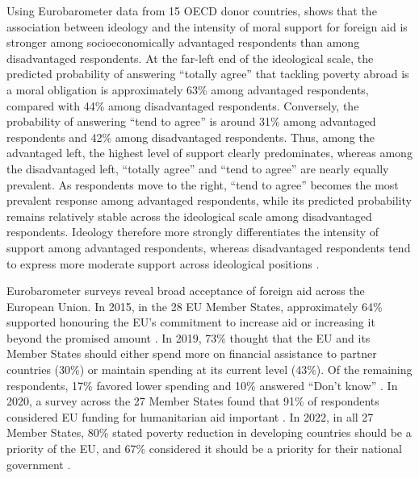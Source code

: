 Using Eurobarometer data from 15 OECD donor countries, \citet{cho_ideology_2024} shows that the association between ideology and the intensity of moral support for foreign aid is stronger among socioeconomically advantaged respondents than among disadvantaged respondents. At the far-left end of the ideological scale, the predicted probability of answering ``totally agree'' that tackling poverty abroad is a moral obligation is approximately 63\% among advantaged respondents, compared with 44\% among disadvantaged respondents. Conversely, the probability of answering ``tend to agree'' is around 31\% among advantaged respondents and 42\% among disadvantaged respondents. Thus, among the advantaged left, the highest level of support clearly predominates, whereas among the disadvantaged left, ``totally agree'' and ``tend to agree'' are nearly equally prevalent. As respondents move to the right, ``tend to agree'' becomes the most prevalent response among advantaged respondents, while its predicted probability remains relatively stable across the ideological scale among disadvantaged respondents. Ideology therefore more strongly differentiates the intensity of support among advantaged respondents, whereas disadvantaged respondents tend to express more moderate support across ideological positions \citep[Figure 1]{cho_ideology_2024}.

Eurobarometer surveys reveal broad acceptance of foreign aid across the European Union. In 2015, in the 28 EU Member States, approximately 64\% supported honouring the EU's commitment to increase aid or increasing it beyond the promised amount \citep{european_commission_2015_eurobarometer}. 
In 2019, 73\% thought that the EU and its Member States should either spend more on financial assistance to partner countries (30\%) or maintain spending at its current level (43\%). Of the remaining respondents, 17\% favored lower spending and 10\% answered ``Don't know'' \citep{european_commission_2019_development}.
In 2020, a survey across the 27 Member States found that 91\% of respondents considered EU funding for humanitarian aid important \citep{european_commission_2021_humanitarian}.
In 2022, in all 27 Member States, 80\% stated poverty reduction in developing countries should be a priority of the EU, and 67\% considered it should be a priority for their national government \citep{european_commission_2022_development}. %
